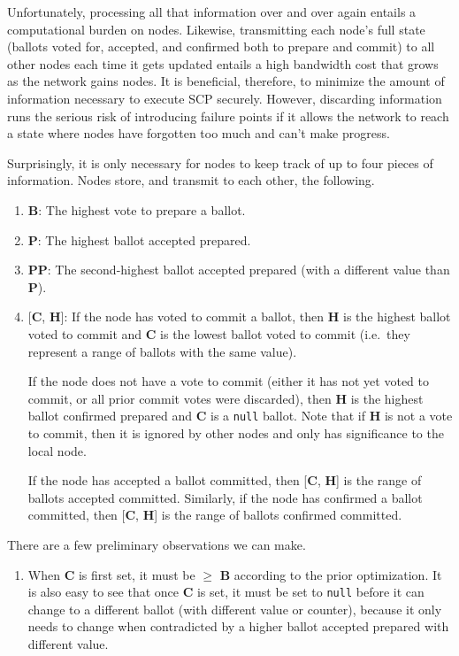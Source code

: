 \begin{enumerate}
    Unfortunately, processing all that information over and over again entails a computational burden on nodes. Likewise, transmitting each node's full state (ballots voted for, accepted, and confirmed both to prepare and commit) to all other nodes each time it gets updated entails a high bandwidth cost that grows as the network gains nodes. It is beneficial, therefore, to minimize the amount of information necessary to execute SCP securely. However, discarding information runs the serious risk of introducing failure points if it allows the network to reach a state where nodes have forgotten too much and can't make progress.

    Surprisingly, it is only necessary for nodes to keep track of up to four pieces of information. Nodes store, and transmit to each other, the following.
    \begin{enumerate}
        \item \textbf{B}: The highest vote to prepare a ballot.

        \item \textbf{P}: The highest ballot accepted prepared.

        \item \textbf{PP}: The second-highest ballot accepted prepared (with a different value than \textbf{P}).

        \item {[\textbf{C}, \textbf{H}]}: If the node has voted to commit a ballot, then \textbf{H} is the highest ballot voted to commit and \textbf{C} is the lowest ballot voted to commit (i.e.\ they represent a range of ballots with the same value).
        
        If the node does not have a vote to commit (either it has not yet voted to commit, or all prior commit votes were discarded), then \textbf{H} is the highest ballot confirmed prepared and \textbf{C} is a {\tt null} ballot. Note that if \textbf{H} is not a vote to commit, then it is ignored by other nodes and only has significance to the local node.

        If the node has accepted a ballot committed, then [\textbf{C}, \textbf{H}] is the range of ballots accepted committed. Similarly, if the node has confirmed a ballot committed, then [\textbf{C}, \textbf{H}] is the range of ballots confirmed committed.
    \end{enumerate}

    There are a few preliminary observations we can make.
    \begin{enumerate}
        \item When \textbf{C} is first set, it must be $\geq$ \textbf{B} according to the prior optimization. It is also easy to see that once \textbf{C} is set, it must be set to {\tt null} before it can change to a different ballot (with different value or counter), because it only needs to change when contradicted by a higher ballot accepted prepared with different value.


\end{enumerate}
\end{enumerate}
